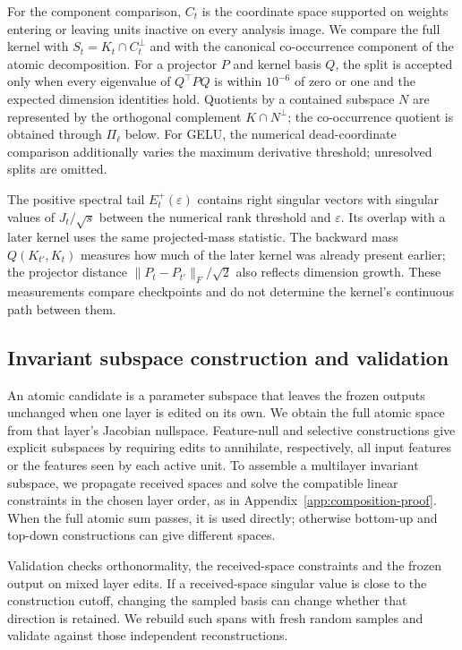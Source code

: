 For the component comparison, $C_t$ is the coordinate space supported on weights entering or leaving units inactive on every analysis image. We compare the full kernel with $S_t=K_t\cap C_t^\perp$ and with the canonical co-occurrence component of the atomic decomposition. For a projector $P$ and kernel basis $Q$, the split is accepted only when every eigenvalue of $Q^\top P Q$ is within $10^{-6}$ of zero or one and the expected dimension identities hold. Quotients by a contained subspace $N$ are represented by the orthogonal complement $K\cap N^\perp$; the co-occurrence quotient is obtained through $\Pi_\ell$ below. For GELU, the numerical dead-coordinate comparison additionally varies the maximum derivative threshold; unresolved splits are omitted.

The positive spectral tail $E_t^+(\varepsilon)$ contains right singular vectors with singular values of $J_t/\sqrt{s}$ between the numerical rank threshold and $\varepsilon$. Its overlap with a later kernel uses the same projected-mass statistic. The backward mass $Q(K_{t'},K_t)$ measures how much of the later kernel was already present earlier; the projector distance $\|P_t-P_{t'}\|_F/\sqrt{2}$ also reflects dimension growth. These measurements compare checkpoints and do not determine the kernel's continuous path between them.

\subsection{Invariant subspace construction and validation}
\label{app:methods-branches}
An atomic candidate is a parameter subspace that leaves the frozen outputs unchanged when one layer is edited on its own. We obtain the full atomic space from that layer's Jacobian nullspace. Feature-null and selective constructions give explicit subspaces by requiring edits to annihilate, respectively, all input features or the features seen by each active unit. To assemble a multilayer invariant subspace, we propagate received spaces and solve the compatible linear constraints in the chosen layer order, as in Appendix~\ref{app:composition-proof}. When the full atomic sum passes, it is used directly; otherwise bottom-up and top-down constructions can give different spaces.

Validation checks orthonormality, the received-space constraints and the frozen output on mixed layer edits. If a received-space singular value is close to the construction cutoff, changing the sampled basis can change whether that direction is retained. We rebuild such spans with fresh random samples and validate against those independent reconstructions. 

